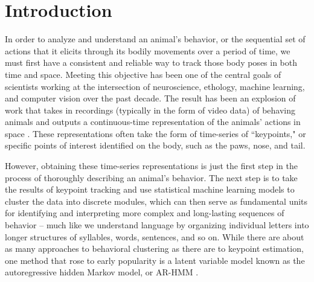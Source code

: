 \section{Introduction}
\label{sec:slds:introduction}

In order to analyze and understand an animal's behavior, or the sequential set of actions that it elicits through its bodily movements over a period of time, we must first have a consistent and reliable way to track those body poses in both time and space. Meeting this objective has been one of the central goals of scientists working at the intersection of neuroscience, ethology, machine learning, and computer vision over the past decade. The result has been an explosion of work that takes in recordings (typically in the form of video data) of behaving animals and outputs a continuous-time representation of the animals' actions in space \cite{toshev_deeppose_2014, tompson_joint_2014, newell_stacked_2016, cao_realtime_2017, mathis_deeplabcut_2018, pereira_fast_2019, batty_behavenet_2019, graving_deepposekit_2019, bohnslav_deepethogram_2021, marshall_continuous_2021, dunn_geometric_2021, lin_characterizing_2022, sun_self-supervised_2022, pereira_sleap_2022, chen_alphatracker_2023}. These representations often take the form of time-series of ``keypoints," or specific points of interest identified on the body, such as the paws, nose, and tail. 

However, obtaining these time-series representations is just the first step in the process of thoroughly describing an animal's behavior. The next step is to take the results of keypoint tracking and use statistical machine learning models to cluster the data into discrete modules, which can then serve as fundamental units for identifying and interpreting more complex and long-lasting sequences of behavior -- much like we understand language by organizing individual letters into longer structures of syllables, words, sentences, and so on. While there are about as many approaches to behavioral clustering as there are to keypoint estimation, one method that rose to early popularity is a latent variable model known as the autoregressive hidden Markov model, or AR-HMM \cite{bryan_autoregressive_2015}. 

